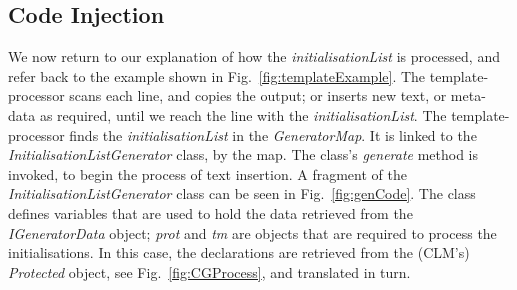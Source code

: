 \documentclass{llncs}%
\begin{document}
\subsection{Code Injection} \label{injection}
We now return to our explanation of how the \emph{initialisationList} is processed, and refer back to the example shown in Fig.~\ref{fig:templateExample}. The template-processor scans each line, and copies the output; or inserts new text, or meta-data as required, until we reach the line with the \emph{initialisationList}. The template-processor finds the \emph{initialisationList} in the \emph{GeneratorMap}. It is linked to the \emph{InitialisationListGenerator} class, by the map. The class's \emph{generate} method is invoked, to begin the process of text insertion. A fragment of the \emph{InitialisationListGenerator} class can be seen in Fig.~\ref{fig:genCode}. The class defines variables that are used to hold the data retrieved from the \emph{IGeneratorData} object;  \emph{prot} and \emph{tm} are objects that are required to process the initialisations. In this case, the declarations are retrieved from the (CLM's) \emph{Protected} object, see Fig.~\ref{fig:CGProcess}, and translated in turn.   
%
%
\end{document}
